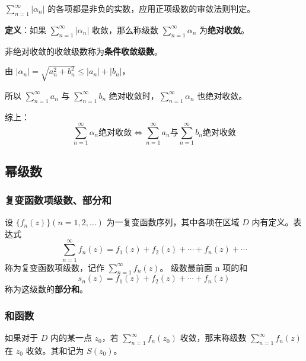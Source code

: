 \begin{tcolorbox}[title={注意},colback=red!5!white
,colframe=red!75!black
,colbacktitle=yellow!50!red
,coltitle=red!25!black, fonttitle=\bfseries,subtitle style={boxrule=0.4pt, colback=yellow!50!red!25!white}]
\(\sum\limits_{n=1}^{\infty} \left| \alpha_n \right|\)
的各项都是非负的实数，应用正项级数的审敛法则判定。

\end{tcolorbox}

\textbf{定义}：如果 \(\sum\limits_{n=1}^{\infty}|\alpha_{n}|\) 收敛，那么称级数
\(\sum\limits_{n=1}^{\infty}\alpha_{n}\) 为\textbf{绝对收敛}。

非绝对收敛的收敛级数称为\textbf{条件收敛级数}。

\begin{tcolorbox}[title={说明},colback=red!5!white
,colframe=red!75!black
,colbacktitle=yellow!50!red
,coltitle=red!25!black, fonttitle=\bfseries,subtitle style={boxrule=0.4pt, colback=yellow!50!red!25!white}]
由 \(|\alpha_{n}|=\sqrt{a_{n}^{2}+b_{n}^{2}}\leq|a_{n}|+|b_{n}|\)，

所以 \(\sum\limits_{n=1}^{\infty}a_{n}\) 与
\(\sum\limits_{n=1}^{\infty}b_{n}\)
绝对收敛时，\(\sum\limits_{n=1}^{\infty}\alpha_{n}\) 也绝对收敛。

综上： \[
\boxed{\sum\limits_{n=1}^{\infty}\alpha_{n} \text{绝对收敛} \Leftrightarrow\sum\limits_{n=1}^{\infty}a_{n} \text{与} \sum\limits_{n=1}^{\infty}b_{n} \text{绝对收敛}}
\]

\end{tcolorbox}
\subsection{幂级数}
\label{幂级数}
\subsubsection{复变函数项级数、部分和}
\label{复变函数项级数部分和}
设 \(\{f_n(z)\}(n=1,2,\ldots)\) 为一复变函数序列，其中各项在区域 \(D\)
内有定义。表达式
\[
\sum_{n=1}^{\infty} f_n(z) = f_1(z) + f_2(z) + \cdots + f_n(z) + \cdots
\]
称为复变函数项级数，记作 \(\sum_{n=1}^{\infty}f_{n}(z)\)。
级数最前面 n 项的和
\[
s_{n}(z)=f_{1}(z)+f_{2}(z)+\cdots +f_{n}(z)
\]
称为这级数的\textbf{部分和}。
\subsubsection{和函数}
\label{和函数}
如果对于 \(D\) 内的某一点 \(z_0\)，若
\(\sum\limits_{n=1}^{\infty} f_n(z_0)\) 收敛，那末称级数
\(\sum\limits_{n=1}^{\infty} f_n(z)\) 在 \(z_0\) 收敛。其和记为
\(S(z_0)\)。

